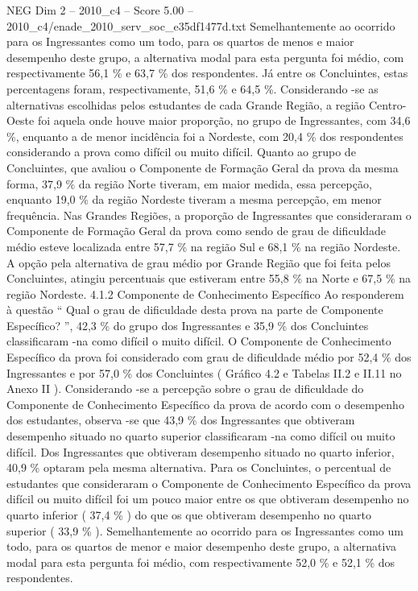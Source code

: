 \begin{textsample}{NEG Dim 2 – 2010\_c4 – Score 5.00 – 2010\_c4/enade\_2010\_serv\_soc\_e35df1477d.txt}
Semelhantemente ao ocorrido para os Ingressantes como um todo, para os quartos de menos e maior desempenho deste grupo, a alternativa modal para esta pergunta foi médio, com respectivamente 56,1 \% e 63,7 \% dos respondentes.
Já entre os Concluintes, estas percentagens foram, respectivamente, 51,6 \% e 64,5 \%.
Considerando -se as alternativas escolhidas pelos estudantes de cada Grande Região, a região Centro-Oeste foi aquela onde houve maior proporção, no grupo de Ingressantes, com 34,6 \%, enquanto a de menor incidência foi a Nordeste, com 20,4 \% dos respondentes considerando a prova como difícil ou muito difícil.
Quanto ao grupo de Concluintes, que avaliou o Componente de Formação Geral da prova da mesma forma, 37,9 \% da região Norte tiveram, em maior medida, essa percepção, enquanto 19,0 \% da região Nordeste tiveram a mesma percepção, em menor frequência.
Nas Grandes Regiões, a proporção de Ingressantes que consideraram o Componente de Formação Geral da prova como sendo de grau de dificuldade médio esteve localizada entre 57,7 \% na região Sul e 68,1 \% na região Nordeste.
A opção pela alternativa de grau médio por Grande Região que foi feita pelos Concluintes, atingiu percentuais que estiveram entre 55,8 \% na Norte e 67,5 \% na região Nordeste. 4.1.2 Componente de Conhecimento Específico Ao responderem à questão “ Qual o grau de dificuldade desta prova na parte de Componente Específico? ”, 42,3 \% do grupo dos Ingressantes e 35,9 \% dos Concluintes classificaram -na como difícil o muito difícil.
O Componente de Conhecimento Específico da prova foi considerado com grau de dificuldade médio por 52,4 \% dos Ingressantes e por 57,0 \% dos Concluintes ( Gráfico 4.2 e Tabelas II.2 e II.11 no Anexo II ).
Considerando -se a percepção sobre o grau de dificuldade do Componente de Conhecimento Específico da prova de acordo com o desempenho dos estudantes, observa -se que 43,9 \% dos Ingressantes que obtiveram desempenho situado no quarto superior classificaram -na como difícil ou muito difícil.
Dos Ingressantes que obtiveram desempenho situado no quarto inferior, 40,9 \% optaram pela mesma alternativa.
Para os Concluintes, o percentual de estudantes que consideraram o Componente de Conhecimento Específico da prova difícil ou muito difícil foi um pouco maior entre os que obtiveram desempenho no quarto inferior ( 37,4 \% ) do que os que obtiveram desempenho no quarto superior ( 33,9 \% ).
Semelhantemente ao ocorrido para os Ingressantes como um todo, para os quartos de menor e maior desempenho deste grupo, a alternativa modal para esta pergunta foi médio, com respectivamente 52,0 \% e 52,1 \% dos respondentes.

\end{textsample}
